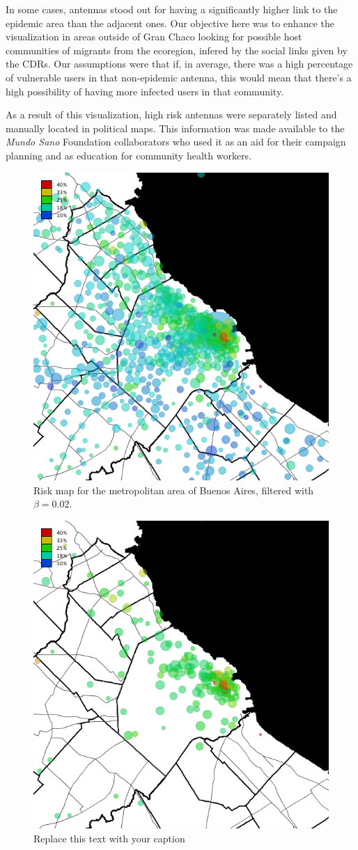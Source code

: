 In some cases, antennas stood out for having a significantly higher link to the epidemic area than the adjacent ones. Our objective here was to enhance the visualization in areas outside of Gran Chaco looking for possible host communities of migrants from the ecoregion, infered by the social links given by the CDRs. Our assumptions were that if, in average, there was a high percentage of vulnerable users in that non-epidemic antenna, this would mean that there's a high possibility of having more infected users in that community.

As a result of this visualization, high risk antennas were separately listed and manually located in political maps. This information was made available to the \textit{Mundo Sano} Foundation collaborators who used it as an aid for their campaign planning and as education for community health workers. 


\begin{figure}[p]
	\centering
	\includegraphics[width=0.75\linewidth]
	{figures/201112_hi_res_amba_usuarios_proporcion_circulos_beta2/201112_hi_res_amba_usuarios_proporcion_circulos_beta2}
	\caption{Risk map for the metropolitan area of Buenos Aires, filtered with $\beta = 0.02$.}
	\label{fig:amba_map}
\end{figure}

\begin{figure}[h!]
	\begin{center}
		\includegraphics[width=0.35\columnwidth]{figures/201112_hi_res_amba_usuarios_proporcion_circulos_beta20/201112_hi_res_amba_usuarios_proporcion_circulos_beta20}
		\caption{Replace this text with your caption%
		}
	\end{center}
\end{figure}

